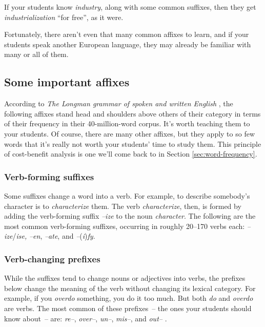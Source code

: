 If your students know \textit{industry}, along with some common suffixes, then they get \textit{industrialization} ``for free'', as it were.

Fortunately, there aren't even that many common affixes to learn, and if your students speak another European language, they may already be familiar with many or all of them. 

\subsection{Some important affixes} \label{sec:derivation}

According to \textit{The Longman grammar of spoken and written English} \citep[401]{Biber1999}, the following affixes stand head and shoulders above others of their category in terms of their frequency in their 40-million-word corpus. It's worth teaching them to your students. Of course, there are many other affixes, but they apply to so few words that it's really not worth your students' time to study them. This principle of cost-benefit analysis is one we'll come back to in Section \ref{sec:word-frequency}.

\subsubsection*{Verb-forming suffixes}
Some suffixes change a word into a verb. For example, to describe somebody's character is to \textit{characterize} them. The verb \textit{characterize}, then, is formed by adding the verb-forming suffix \textit{--ize} to the noun \textit{character}. The following are the most common verb-forming suffixes, occurring in roughly 20--170 verbs each: \textit{--ize}/\textit{ise,} \textit{--en}, \textit{--ate}, and \textit{--}(\textit{i})\textit{fy}. 

\subsubsection*{Verb-changing prefixes}
While the suffixes tend to change nouns or adjectives into verbs, the prefixes below change the meaning of the verb without changing its lexical category. For example, if you \textit{overdo} something, you do it too much. But both \textit{do} and \textit{overdo} are verbs. The most common of these prefixes~-- the ones your students should know about~-- are: \textit{re--}, \textit{over--}, \textit{un--}, \textit{mis--}, and \textit{out--} \citep[400]{Biber1999}.

